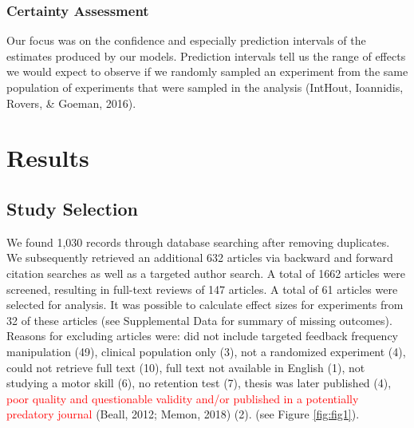 \documentclass[
  english,
  man, donotrepeattitle,mask,floatsintext]{apa7}
\begin{document}
\hypertarget{certainty-assessment}{%
\subsubsection{Certainty Assessment}\label{certainty-assessment}}

Our focus was on the confidence and especially prediction intervals of the estimates produced by our models. Prediction intervals tell us the range of effects we would expect to observe if we randomly sampled an experiment from the same population of experiments that were sampled in the analysis (IntHout, Ioannidis, Rovers, \& Goeman, 2016).

\hypertarget{results}{%
\section{Results}\label{results}}

\hypertarget{study-selection}{%
\subsection{Study Selection}\label{study-selection}}

We found 1,030 records through database searching after removing duplicates. We subsequently retrieved an additional 632 articles via backward and forward citation searches as well as a targeted author search. A total of 1662 articles were screened, resulting in full-text reviews of 147 articles. A total of 61 articles were selected for analysis. It was possible to calculate effect sizes for experiments from 32 of these articles (see Supplemental Data for summary of missing outcomes). Reasons for excluding articles were: did not include targeted feedback frequency manipulation (49), clinical population only (3), not a randomized experiment (4), could not retrieve full text (10), full text not available in English (1), not studying a motor skill (6), no retention test (7), thesis was later published (4), \textcolor{red}{poor quality and questionable validity and/or published in a potentially predatory journal} (Beall, 2012; Memon, 2018) (2). (see Figure \ref{fig:fig1}).
\end{document}
